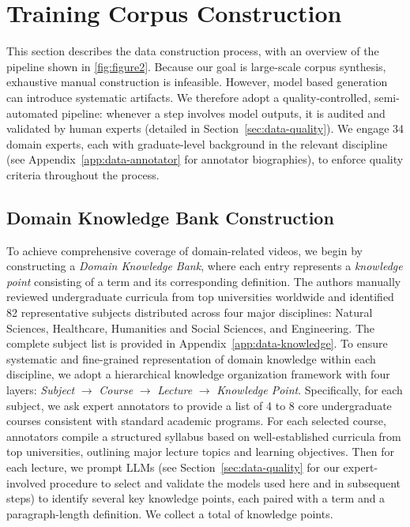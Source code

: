 \section{\data Training Corpus Construction}\label{sec:data}
This section describes the \ours data construction process, with an overview of the pipeline shown in \autoref{fig:figure2}.
Because our goal is large-scale corpus synthesis, exhaustive manual construction is infeasible. However, model based generation can introduce systematic artifacts. We therefore adopt a quality-controlled, semi-automated pipeline: whenever a step involves model outputs, it is audited and validated by human experts (detailed in Section~\ref{sec:data-quality}). We engage 34 domain experts, each with graduate-level background in the relevant discipline (see Appendix~\ref{app:data-annotator} for annotator biographies), to enforce quality criteria throughout the process.

\subsection{Domain Knowledge Bank Construction}
\label{sec:31}
To achieve comprehensive coverage of domain-related videos, we begin by constructing a \emph{Domain Knowledge Bank}, where each entry represents a \emph{knowledge point} consisting of a term and its corresponding definition. 
The authors manually reviewed undergraduate curricula from top universities worldwide and identified 82 representative subjects distributed across four major disciplines: Natural Sciences, Healthcare, Humanities and Social Sciences, and Engineering. The complete subject list is provided in Appendix~\ref{app:data-knowledge}.
To ensure systematic and fine-grained representation of domain knowledge within each discipline, we adopt a hierarchical knowledge organization framework with four layers: \textit{Subject} $\rightarrow$ \textit{Course} $\rightarrow$ \textit{Lecture} $\rightarrow$ \textit{Knowledge Point}.
Specifically, for each subject, we ask expert annotators to provide a list of 4 to 8 core undergraduate courses consistent with standard academic programs. For each selected course, annotators compile a structured syllabus based on well-established curricula from top universities, outlining major lecture topics and learning objectives. Then for each lecture, we prompt LLMs (see Section~\ref{sec:data-quality} for our expert-involved procedure to select and validate the models used here and in subsequent steps) to identify several key knowledge points, each paired with a term and a paragraph-length definition.
We collect a total of \numknow knowledge points.

